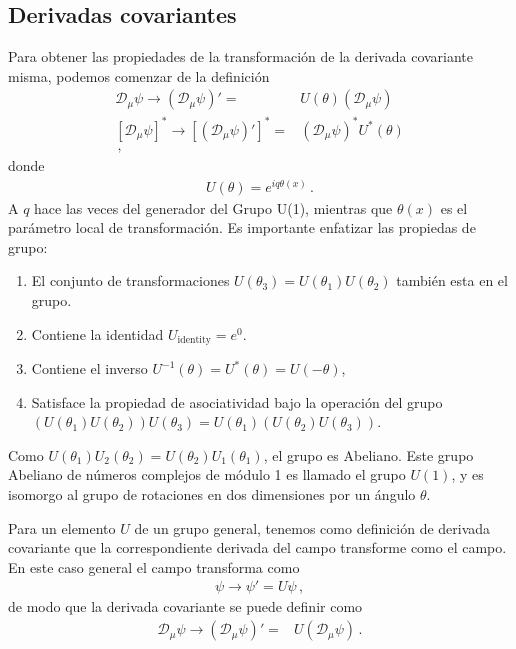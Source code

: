 \subsection{Derivadas covariantes}
\label{sec:dv}
Para obtener las propiedades de la transformación de la derivada covariante misma, podemos comenzar de la definición
\begin{align}
    \mathcal{D}_\mu \psi\to\left(\mathcal{D}_\mu \psi\right)'=&U(\theta)\left(\mathcal{D}_\mu \psi\right) \nonumber\\
    \left[ \mathcal{D}_\mu \psi  \right]^{*}\to \left[ \left(\mathcal{D}_\mu \psi\right)'  \right]^{*}=&\left(\mathcal{D}_\mu \psi\right)^{*} U^{*}(\theta) \nonumber\\
\,,
\end{align}
donde
\begin{align}
  U(\theta)=e^{iq\theta(x)}\,.
\end{align}
A $q$ hace las veces del generador del Grupo U(1), mientras que $\theta(x)$ es el parámetro local de transformación.
Es importante enfatizar las propiedas de grupo:
\begin{enumerate}
\item El conjunto de transformaciones  $U(\theta_3)=U(\theta_1)U(\theta_2)$ también esta en el grupo.
\item Contiene la identidad
$U_{\text{identity}}=e^{0}$.
\item Contiene  el inverso $U^{-1}(\theta)=U^{*}(\theta)=U(-\theta)$,
\item Satisface la propiedad de asociatividad bajo la operación del grupo $\left( U(\theta_1)U(\theta_2) \right)U (\theta_3 )=U(\theta_1)\left( U(\theta_2)U(\theta_3) \right)$. 
\end{enumerate}
Como $U(\theta_1)U_2(\theta_2)=U(\theta_2)U_1(\theta_1)$, el grupo es Abeliano. Este grupo Abeliano de números complejos de módulo 1 es llamado el grupo $U(1)$, 
y es isomorgo al grupo de rotaciones en dos dimensiones por un ángulo  $\theta$. 


Para un elemento $U$ de un grupo general, tenemos como definición de derivada covariante que la correspondiente derivada del campo transforme como el campo. En este caso general el campo transforma como
\begin{align}
  \psi\to\psi'=U\psi\,,
\end{align}
de modo que la derivada covariante se puede definir como
\begin{align}
     \mathcal{D}_\mu \psi\to\left(\mathcal{D}_\mu \psi\right)'=&U\left(\mathcal{D}_\mu \psi\right)\,.
\end{align}

